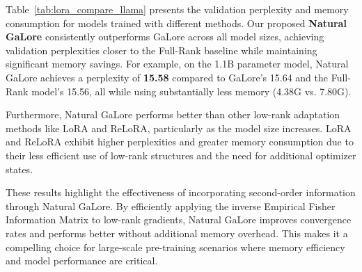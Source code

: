 Table~\ref{tab:lora_compare_llama} presents the validation perplexity and memory consumption for models trained with different methods. Our proposed \textbf{Natural GaLore} consistently outperforms GaLore across all model sizes, achieving validation perplexities closer to the Full-Rank baseline while maintaining significant memory savings. For example, on the 1.1B parameter model, Natural GaLore achieves a perplexity of \textbf{15.58} compared to GaLore's 15.64 and the Full-Rank model's 15.56, all while using substantially less memory (4.38G vs. 7.80G).

Furthermore, Natural GaLore performs better than other low-rank adaptation methods like LoRA and ReLoRA, particularly as the model size increases. LoRA and ReLoRA exhibit higher perplexities and greater memory consumption due to their less efficient use of low-rank structures and the need for additional optimizer states.

These results highlight the effectiveness of incorporating second-order information through Natural GaLore. By efficiently applying the inverse Empirical Fisher Information Matrix to low-rank gradients, Natural GaLore improves convergence rates and performs better without additional memory overhead. This makes it a compelling choice for large-scale pre-training scenarios where memory efficiency and model performance are critical.

\vspace{-2mm}




